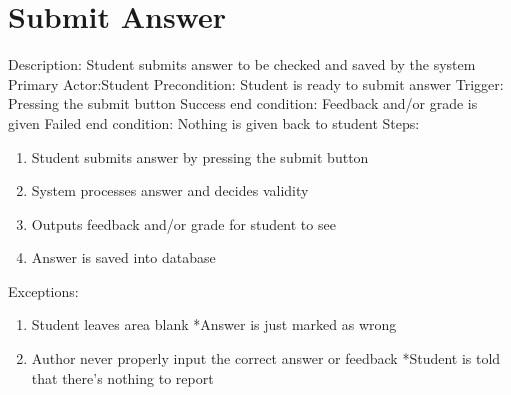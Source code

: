     \section{Submit Answer}
        Description: Student submits answer to be checked and saved by the system \newline
        Primary Actor:Student \newline
        Precondition: Student is ready to submit answer \newline
        Trigger: Pressing the submit button \newline
        Success end condition: Feedback and/or grade is given       \newline
        Failed end condition: Nothing is given back to student      \newline
        \newline
        Steps:
        \begin{enumerate}
            \item{Student submits answer by pressing the submit             button}
            \item{System processes answer and decides validity}
            \item{Outputs feedback and/or grade for student to see}
            \item{Answer is saved into database}
        \end{enumerate}
        Exceptions:
        \begin{enumerate}
            \item{Student leaves area blank \newline
        	*Answer is just marked as wrong}
        	\addtocounter{enumi}{1}
            \item{Author never properly input the correct answer or     feedback \newline
        	*Student is told that there's nothing to report}
        \end{enumerate}

    
